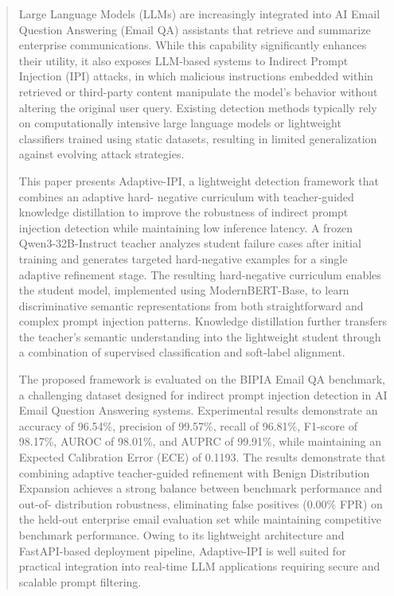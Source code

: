 \documentclass[conference]{IEEEtran}
\begin{document}
\begin{abstract}
Large Language Models (LLMs) are increasingly integrated into AI Email Question Answering (Email QA)
assistants that retrieve and summarize enterprise communications. While this capability
significantly enhances their utility, it also exposes LLM-based systems to Indirect Prompt Injection
(IPI) attacks, in which malicious instructions embedded within retrieved or third-party content
manipulate the model's behavior without altering the original user query. Existing detection methods
typically rely on computationally intensive large language models or lightweight classifiers trained
using static datasets, resulting in limited generalization against evolving attack strategies.

This paper presents Adaptive-IPI, a lightweight detection framework that combines an adaptive hard-
negative curriculum with teacher-guided knowledge distillation to improve the robustness of indirect
prompt injection detection while maintaining low inference latency. A frozen Qwen3-32B-Instruct
teacher analyzes student failure cases after initial training and generates targeted hard-negative
examples for a single adaptive refinement stage. The resulting hard-negative curriculum enables the
student model, implemented using ModernBERT-Base, to learn discriminative semantic representations
from both straightforward and complex prompt injection patterns. Knowledge distillation further
transfers the teacher's semantic understanding into the lightweight student through a combination of
supervised classification and soft-label alignment.

The proposed framework is evaluated on the BIPIA Email QA benchmark, a challenging dataset designed
for indirect prompt injection detection in AI Email Question Answering systems. Experimental results
demonstrate an accuracy of 96.54\%, precision of 99.57\%, recall of 96.81\%, F1-score of 98.17\%,
AUROC of 98.01\%, and AUPRC of 99.91\%, while maintaining an Expected Calibration Error (ECE) of
0.1193. The results demonstrate that combining adaptive teacher-guided refinement with Benign
Distribution Expansion achieves a strong balance between benchmark performance and out-of-
distribution robustness, eliminating false positives (0.00\% FPR) on the held-out enterprise email
evaluation set while maintaining competitive benchmark performance. Owing to its lightweight
architecture and FastAPI-based deployment pipeline, Adaptive-IPI is well suited for practical
integration into real-time LLM applications requiring secure and scalable prompt filtering.
\end{abstract}
\end{document}
